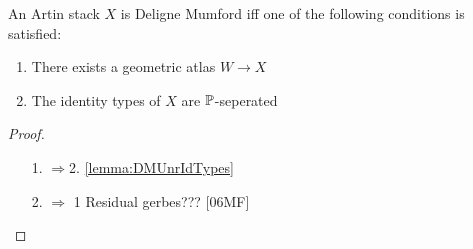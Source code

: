 \documentclass{article}
\begin{document}
\begin{theorem}[TODO]
	An Artin stack $X$ is Deligne Mumford iff one of the following conditions is satisfied:
	\begin{enumerate}
		\item There exists a geometric atlas $W \to X$
		\item The identity types of $X$ are $\mathbb{P}$-seperated
	\end{enumerate}
\end{theorem}
\begin{proof}
	\begin{enumerate}
		\item [1. $\Rightarrow $2.] \ref{lemma:DMUnrIdTypes}
		\item [2. $\Rightarrow$ 1] Residual gerbes??? [06MF]
	\end{enumerate}
\end{proof}
%
%	
%

\end{document}
